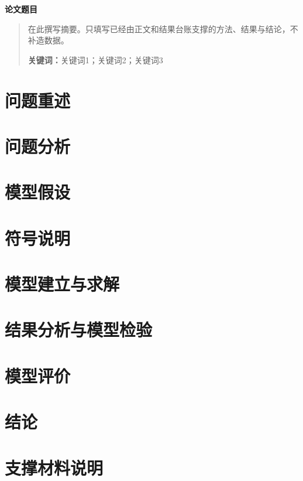 \documentclass[12pt,a4paper]{ctexart}
\numberwithin{equation}{section}
\begin{document}

\begin{center}
    {\LARGE \textbf{论文题目}}\\[1em]
\end{center}

\begin{abstract}
在此撰写摘要。只填写已经由正文和结果台账支撑的方法、结果与结论，不补造数据。

\noindent\textbf{关键词：}关键词1；关键词2；关键词3
\end{abstract}

\section{问题重述}

\section{问题分析}

\section{模型假设}

\section{符号说明}

\section{模型建立与求解}

\section{结果分析与模型检验}

\section{模型评价}

\section{结论}

\begin{thebibliography}{99}
\end{thebibliography}

\appendix
\section{支撑材料说明}
\end{document}
